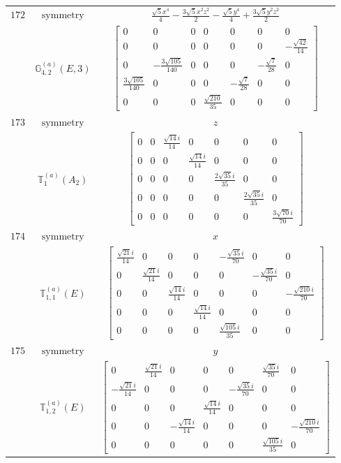 \documentclass[fleqn,8pt,landscape]{jsarticle}
\begin{document}
\begin{longtable}{ccc}
$ 172 $ & $ \text{symmetry} $ & $ \frac{\sqrt{5} x^{4}}{4} - \frac{3 \sqrt{5} x^{2} z^{2}}{2} - \frac{\sqrt{5} y^{4}}{4} + \frac{3 \sqrt{5} y^{2} z^{2}}{2} $ \\
$  $ & $ \mathbb{G}_{4,2}^{(a)}(E,3) $ & $ \begin{bmatrix} 0 & 0 & 0 & 0 & 0 & 0 & 0 \\ 0 & 0 & 0 & 0 & 0 & 0 & - \frac{\sqrt{42}}{14} \\ 0 & - \frac{3 \sqrt{105}}{140} & 0 & 0 & 0 & - \frac{\sqrt{7}}{28} & 0 \\ \frac{3 \sqrt{105}}{140} & 0 & 0 & 0 & - \frac{\sqrt{7}}{28} & 0 & 0 \\ 0 & 0 & 0 & \frac{\sqrt{210}}{35} & 0 & 0 & 0 \end{bmatrix} $ \\ \hline
$ 173 $ & $ \text{symmetry} $ & $ z $ \\
$  $ & $ \mathbb{T}_{1}^{(a)}(A_{2}) $ & $ \begin{bmatrix} 0 & 0 & \frac{\sqrt{14} i}{14} & 0 & 0 & 0 & 0 \\ 0 & 0 & 0 & \frac{\sqrt{14} i}{14} & 0 & 0 & 0 \\ 0 & 0 & 0 & 0 & \frac{2 \sqrt{35} i}{35} & 0 & 0 \\ 0 & 0 & 0 & 0 & 0 & \frac{2 \sqrt{35} i}{35} & 0 \\ 0 & 0 & 0 & 0 & 0 & 0 & \frac{3 \sqrt{70} i}{70} \end{bmatrix} $ \\ \hline
$ 174 $ & $ \text{symmetry} $ & $ x $ \\
$  $ & $ \mathbb{T}_{1,1}^{(a)}(E) $ & $ \begin{bmatrix} \frac{\sqrt{21} i}{14} & 0 & 0 & 0 & - \frac{\sqrt{35} i}{70} & 0 & 0 \\ 0 & \frac{\sqrt{21} i}{14} & 0 & 0 & 0 & - \frac{\sqrt{35} i}{70} & 0 \\ 0 & 0 & \frac{\sqrt{14} i}{14} & 0 & 0 & 0 & - \frac{\sqrt{210} i}{70} \\ 0 & 0 & 0 & \frac{\sqrt{14} i}{14} & 0 & 0 & 0 \\ 0 & 0 & 0 & 0 & \frac{\sqrt{105} i}{35} & 0 & 0 \end{bmatrix} $ \\ \hline
$ 175 $ & $ \text{symmetry} $ & $ y $ \\
$  $ & $ \mathbb{T}_{1,2}^{(a)}(E) $ & $ \begin{bmatrix} 0 & \frac{\sqrt{21} i}{14} & 0 & 0 & 0 & \frac{\sqrt{35} i}{70} & 0 \\ - \frac{\sqrt{21} i}{14} & 0 & 0 & 0 & - \frac{\sqrt{35} i}{70} & 0 & 0 \\ 0 & 0 & 0 & \frac{\sqrt{14} i}{14} & 0 & 0 & 0 \\ 0 & 0 & - \frac{\sqrt{14} i}{14} & 0 & 0 & 0 & - \frac{\sqrt{210} i}{70} \\ 0 & 0 & 0 & 0 & 0 & \frac{\sqrt{105} i}{35} & 0 \end{bmatrix} $ \\ \hline

\end{longtable}
\end{document}
